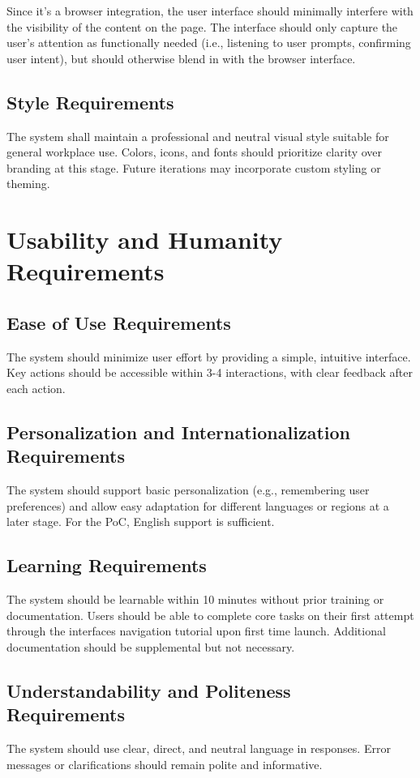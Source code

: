 \documentclass[12pt]{article}
\begin{document}
Since it’s a browser integration, the user interface should minimally interfere with the visibility of the content on the page. The interface should only capture the user’s attention as functionally needed (i.e., listening to user prompts, confirming user intent), but should otherwise blend in with the browser interface.

\subsection{Style Requirements}
The system shall maintain a professional and neutral visual style suitable for general workplace use. Colors, icons, and fonts should prioritize clarity over branding at this stage. Future iterations may incorporate custom styling or theming.


\section{Usability and Humanity Requirements}
\subsection{Ease of Use Requirements}
The system should minimize user effort by providing a simple, intuitive interface. Key actions should be accessible within 3-4 interactions, with clear feedback after each action.
\subsection{Personalization and Internationalization Requirements}
The system should support basic personalization (e.g., remembering user preferences) and allow easy adaptation for different languages or regions at a later stage. For the PoC, English support is sufficient.
\subsection{Learning Requirements}
The system should be learnable within 10 minutes without prior training or documentation. Users should be able to complete core tasks on their first attempt through the interfaces navigation tutorial upon first time launch. Additional documentation should be supplemental but not necessary. 
\subsection{Understandability and Politeness Requirements}
The system should use clear, direct, and neutral language in responses. Error messages or clarifications should remain polite and informative.
\end{document}
